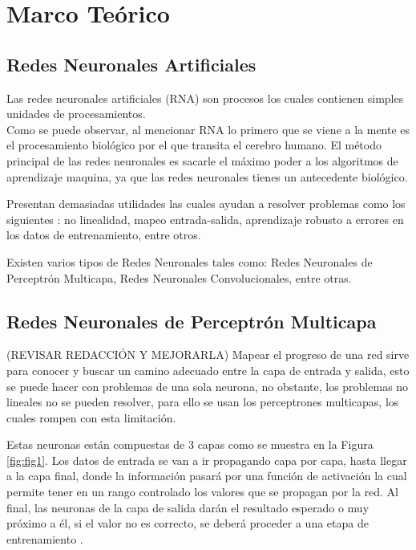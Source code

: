 \section{Marco Teórico}

    
    
    \subsection{Redes Neuronales Artificiales}

        
        Las redes neuronales artificiales (RNA) son procesos los cuales contienen simples unidades de procesamientos. \\
        Como se puede observar, al mencionar RNA lo primero que se viene a la mente es el procesamiento biol\'ogico por el que transita el 
        cerebro humano. El m\'etodo principal de las redes neuronales es sacarle el máximo poder a los algoritmos de aprendizaje maquina, ya que las redes neuronales 
        tienes un antecedente biol\'ogico.

        Presentan demasiadas utilidades las cuales ayudan a  resolver problemas como los siguientes \cite{liu2015}: 
        no linealidad, mapeo entrada-salida, aprendizaje robusto a errores en los datos de entrenamiento, entre otros.

        Existen varios tipos de Redes Neuronales tales como: Redes Neuronales de Perceptr\'on Multicapa, Redes Neuronales Convolucionales, entre otras.
    
        \subsection{Redes Neuronales de Perceptr\'on Multicapa}

(REVISAR REDACCIÓN Y MEJORARLA)
            Mapear el progreso de una red sirve para conocer y buscar un camino adecuado entre la capa de entrada y salida, esto se puede hacer 
            con problemas de una sola neurona, no obstante, los problemas no lineales no se pueden resolver, para ello se usan los perceptrones
            multicapas, los cuales rompen con esta limitaci\'on.

            Estas neuronas est\'an compuestas de 3 capas como se muestra en la Figura \ref{fig:fig1}.
            Los datos de entrada se van a ir propagando capa por capa, hasta llegar a la capa final, donde la información pasará
            por una funci\'on de activaci\'on la cual permite tener en un rango controlado los valores que se propagan por la red. Al final, las neuronas de la capa de salida darán el resultado esperado o muy próximo a él, si el valor no es correcto, se deberá proceder a una etapa de entrenamiento \cite{liu2015}.

